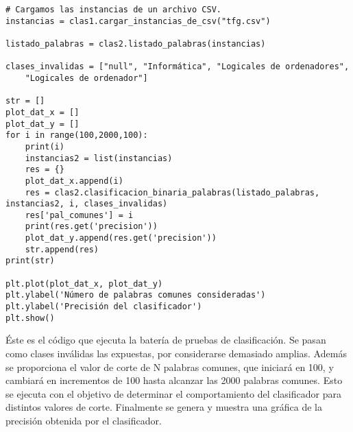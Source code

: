 \begin{center}
\begin{minipage}{\linewidth}
\begin{lstlisting}[caption=Batería de pruebas de clasificación]
# Cargamos las instancias de un archivo CSV.
instancias = clas1.cargar_instancias_de_csv("tfg.csv")

listado_palabras = clas2.listado_palabras(instancias)

clases_invalidas = ["null", "Informática", "Logicales de ordenadores",
    "Logicales de ordenador"]

str = []
plot_dat_x = []
plot_dat_y = []
for i in range(100,2000,100):
    print(i)
    instancias2 = list(instancias)
    res = {}
    plot_dat_x.append(i)
    res = clas2.clasificacion_binaria_palabras(listado_palabras, instancias2, i, clases_invalidas)
    res['pal_comunes'] = i
    print(res.get('precision'))
    plot_dat_y.append(res.get('precision'))
    str.append(res)
print(str)

plt.plot(plot_dat_x, plot_dat_y)
plt.ylabel('Número de palabras comunes consideradas')
plt.ylabel('Precisión del clasificador')
plt.show()
\end{lstlisting}
\end{minipage}
\end{center}

Éste es el código que ejecuta la batería de pruebas de clasificación. Se pasan como clases inválidas las expuestas, por considerarse demasiado amplias. Además se proporciona el valor de corte de N palabras comunes, que iniciará en 100, y cambiará en incrementos de 100 hasta alcanzar las 2000 palabras comunes.
%
Esto se ejecuta con el objetivo de determinar el comportamiento del clasificador para distintos valores de corte. Finalmente se genera y muestra una gráfica de la precisión obtenida por el clasificador.